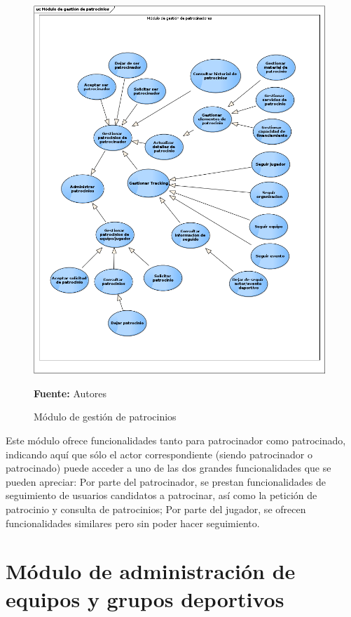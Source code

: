 \begin{figure}[!htb]
  \begin{center}
    \includegraphics[width=11cm]{./imagenes/casos_uso/gestion_patrocinios.png}
    \caption{Módulo de gestión de patrocinios}
    \label{fig:cu_gest_patr}
    \textbf{Fuente:} Autores \\
  \end{center}
\end{figure}

Este módulo ofrece funcionalidades tanto para patrocinador como patrocinado, indicando aquí que sólo el actor correspondiente (siendo patrocinador o patrocinado) puede acceder a uno de las dos grandes funcionalidades que se pueden apreciar: Por parte del patrocinador, se prestan funcionalidades de seguimiento de usuarios candidatos a patrocinar, así como la petición de patrocinio y consulta de patrocinios; Por parte del jugador, se ofrecen funcionalidades similares pero sin poder hacer seguimiento.

\section{Módulo de administración de equipos y grupos deportivos}

